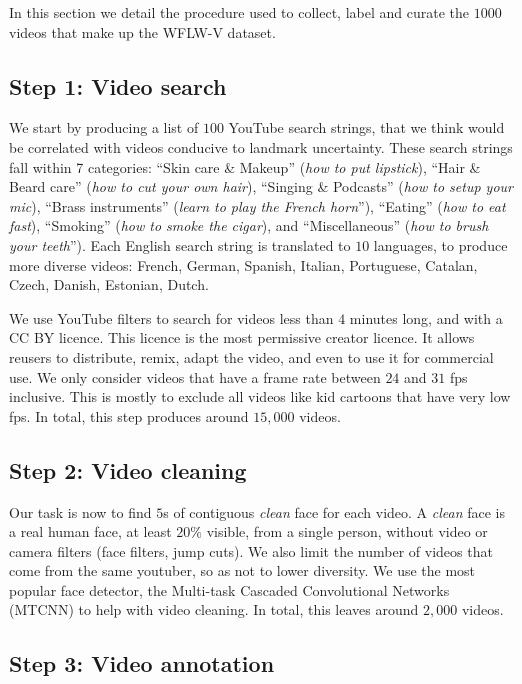 \documentclass[10pt,twocolumn,letterpaper]{article}
\begin{document}
In this section we detail the procedure used to collect, label and curate the $1000$ videos that make up the WFLW-V dataset. 

\subsection*{Step 1: Video search}

We start by producing a list of $100$ YouTube search strings, that we think would be correlated with videos conducive to landmark uncertainty. These search strings fall within 7 categories: ``Skin care \& Makeup'' (\eg \textit{how to put lipstick}), ``Hair \& Beard care'' (\eg \textit{how to cut your own hair}), ``Singing \& Podcasts'' (\eg \textit{how to setup your mic}), ``Brass instruments'' (\eg \textit{learn to play the French horn}''), ``Eating'' (\eg \textit{how to eat fast}), ``Smoking'' (\eg \textit{how to smoke the cigar}), and ``Miscellaneous'' (\eg \textit{how to brush your teeth}''). Each English search string is translated to $10$ languages, to produce more diverse videos: French, German, Spanish, Italian, Portuguese, Catalan, Czech, Danish, Estonian, Dutch.

We use YouTube filters to search for videos less than $4$ minutes long, and with a CC BY licence. This licence is the most permissive creator licence. It allows reusers to distribute, remix, adapt the video, and even to use it for commercial use. We only consider videos that have a frame rate between $24$ and $31$ fps inclusive. This is mostly to exclude all videos like kid cartoons that have very low fps. In total, this step produces around $15,000$ videos. 

\subsection*{Step 2: Video cleaning}

Our task is now to find $5$s of contiguous \textit{clean} face for each video. A \textit{clean} face is a real human face, at least $20\%$ visible, from a single person, without video or camera filters (\eg face filters, jump cuts). We also limit the number of videos that come from the same youtuber, so as not to lower diversity. We use the most popular face detector, the Multi-task Cascaded Convolutional Networks (MTCNN) \cite{Zhang2017MTCNN} to help with video cleaning. In total, this leaves around $2,000$ videos. 

\subsection*{Step 3: Video annotation}
\end{document}
